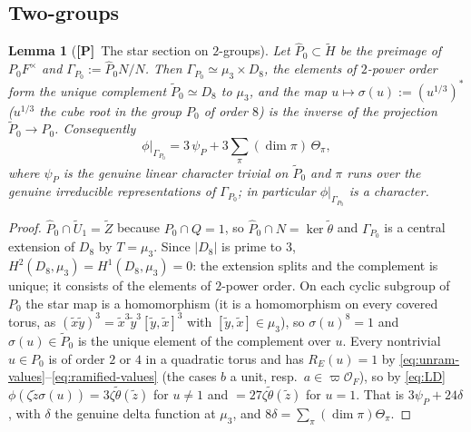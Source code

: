 \documentclass[11pt]{article}
\newcommand{\tH}{\widetilde H}
\newcommand{\tZ}{\widetilde Z}
\newcommand{\tU}{\widetilde U}
\newcommand{\tth}{\widetilde\theta}
\newcommand{\Ocal}{\mathcal O}
\newcommand{\Ptag}{\textnormal{\textbf{[P]}}}
\theoremstyle{plain}
\newtheorem{lemma}[theorem]{Lemma}
\theoremstyle{definition}
\begin{document}
\subsection{Two-groups}
\begin{lemma}[\Ptag\ The star section on $2$-groups]\label{lem:2groups}
Let $\hat P_0\subset\tH$ be the preimage of $P_0F^\times$ and
$\Gamma_{P_0}:=\hat P_0N/N$.  Then $\Gamma_{P_0}\simeq\mu_3\times D_8$,
the elements of $2$-power order form the unique complement
$\tilde P_0\simeq D_8$ to $\mu_3$, and the map
$u\mapsto\sigma(u):=(u^{1/3})^*$ ($u^{1/3}$ the cube root in the
group $P_0$ of order $8$) is the inverse of the projection
$\tilde P_0\to P_0$.  Consequently
\begin{equation}\label{eq:phiP0}
 \phi|_{\Gamma_{P_0}}=3\,\psi_{P}+3\sum_{\pi}(\dim\pi)\,\Theta_\pi ,
\end{equation}
where $\psi_P$ is the genuine linear character trivial on $\tilde P_0$ and
$\pi$ runs over the genuine irreducible representations of $\Gamma_{P_0}$;
in particular $\phi|_{\Gamma_{P_0}}$ is a character.
\end{lemma}
\begin{proof}
$\hat P_0\cap\tU_1=\tZ$ because $P_0\cap Q=1$, so $\hat P_0\cap N=\ker\tth$
and $\Gamma_{P_0}$ is a central extension of $D_8$ by $T=\mu_3$.
Since $|D_8|$ is prime to $3$, $H^2(D_8,\mu_3)=H^1(D_8,\mu_3)=0$: the
extension splits and the complement is unique; it consists of the
elements of $2$-power order.  On each cyclic subgroup of $P_0$ the star
map is a homomorphism (it is a homomorphism on every covered torus, as
$(\tilde x\tilde y)^3=\tilde x^3\tilde y^3[\tilde y,\tilde x]^3$ with
$[\tilde y,\tilde x]\in\mu_3$), so $\sigma(u)^8=1$ and $\sigma(u)\in\tilde P_0$
is the unique element of the complement over $u$.  Every nontrivial
$u\in P_0$ is of order $2$ or $4$ in a quadratic torus and has
$R_E(u)=1$ by \eqref{eq:unram-values}--\eqref{eq:ramified-values}
(the cases $b$ a unit, resp.\ $a\in\varpi\Ocal_F$), so by \eqref{eq:LD}
$\phi(\zeta\tilde z\sigma(u))=3\zeta\tth(\tilde z)$ for $u\ne1$ and
$=27\zeta\tth(\tilde z)$ for $u=1$.  That is $3\psi_P+24\delta$, with
$\delta$ the genuine delta function at $\mu_3$, and
$8\delta=\sum_\pi(\dim\pi)\Theta_\pi$.
\end{proof}
\end{document}
